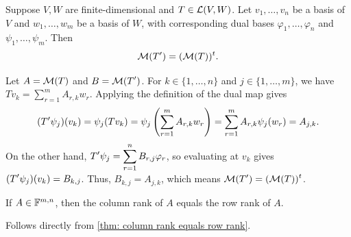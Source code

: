 \setcounter{thm}{131}
\begin{thm}
  Suppose $V, W$ are finite-dimensional and $T \in \mathcal{L}(V,W)$. Let $v_1, \dots, v_n$ be a basis of $V$ and $w_1, \dots, w_m$ be a basis of $W$, with corresponding dual bases $\varphi_1, \dots, \varphi_n$ and $\psi_1, \dots, \psi_m$. Then
  \begin{equation}
    \mathcal{M}(\displaystyle T') = (\mathcal{M}(T))^{t}.
  \end{equation}
\end{thm}
\begin{prf}
  Let $A = \mathcal{M}(T)$ and $B = \mathcal{M}(\displaystyle T')$.
  For $k \in \{1, \dots, n\}$ and $j \in \{1, \dots, m\}$, we have $Tv_k = \sum_{r=1}^m A_{r,k} w_r$.
  Applying the definition of the dual map gives
  \begin{equation}
    (\displaystyle T'\psi_j)(v_k) = \psi_j(Tv_k) = \psi_j\left(\sum_{r=1}^m A_{r,k} w_r\right) = \sum_{r=1}^m A_{r,k} \psi_j(w_r) = A_{j,k}.
  \end{equation}
  On the other hand, $\displaystyle T'\psi_j = \sum_{r=1}^n B_{r,j} \varphi_r$, so evaluating at $v_k$ gives $(\displaystyle T'\psi_j)(v_k) = B_{k,j}$.
  Thus, $B_{k,j} = A_{j,k}$, which means $\mathcal{M}(\displaystyle T') = (\mathcal{M}(T))^t$.
\end{prf}

\begin{thm}
  If $A \in \mathbb{F}^{m,n}$, then the column rank of $A$ equals the row rank of $A$.
\end{thm}
\begin{prf}
  Follows directly from \ref{thm: column rank equals row rank}.
\end{prf}